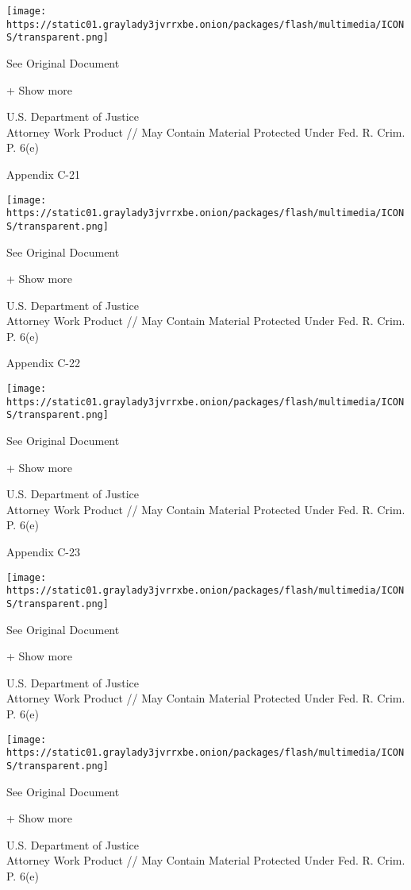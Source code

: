 \texttt{[image: https://static01.graylady3jvrrxbe.onion/packages/flash/multimedia/ICONS/transparent.png]}

See Original Document

+ Show more

U.S. Department of Justice\\
Attorney Work Product // May Contain Material Protected Under Fed. R.
Crim. P. 6(e)

Appendix C-21

\protect\hyperlink{}{}

\texttt{[image: https://static01.graylady3jvrrxbe.onion/packages/flash/multimedia/ICONS/transparent.png]}

See Original Document

+ Show more

U.S. Department of Justice\\
Attorney Work Product // May Contain Material Protected Under Fed. R.
Crim. P. 6(e)

Appendix C-22

\protect\hyperlink{}{}

\texttt{[image: https://static01.graylady3jvrrxbe.onion/packages/flash/multimedia/ICONS/transparent.png]}

See Original Document

+ Show more

U.S. Department of Justice\\
Attorney Work Product // May Contain Material Protected Under Fed. R.
Crim. P. 6(e)

Appendix C-23

\protect\hyperlink{}{}

\texttt{[image: https://static01.graylady3jvrrxbe.onion/packages/flash/multimedia/ICONS/transparent.png]}

See Original Document

+ Show more

U.S. Department of Justice\\
Attorney Work Product // May Contain Material Protected Under Fed. R.
Crim. P. 6(e)

\protect\hyperlink{}{}

\texttt{[image: https://static01.graylady3jvrrxbe.onion/packages/flash/multimedia/ICONS/transparent.png]}

See Original Document

+ Show more

U.S. Department of Justice\\
Attorney Work Product // May Contain Material Protected Under Fed. R.
Crim. P. 6(e)


